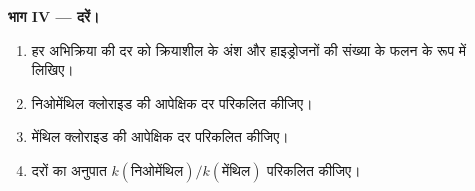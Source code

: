 \begin{problem}
\medskip
\noindent\textbf{भाग IV --- दरें।}
\begin{enumerate}[resume]
  \item हर अभिक्रिया की दर को क्रियाशील  के अंश और
         हाइड्रोजनों की संख्या के फलन के रूप में लिखिए।
  \item निओमेंथिल क्लोराइड की आपेक्षिक दर परिकलित कीजिए।
  \item मेंथिल क्लोराइड की आपेक्षिक दर परिकलित कीजिए।
  \item दरों का अनुपात $k(\text{निओमेंथिल})/k(\text{मेंथिल})$ परिकलित कीजिए।
\end{enumerate}
\end{problem}
